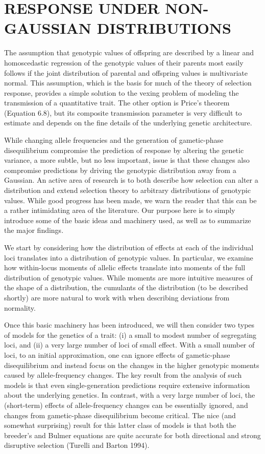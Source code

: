 \documentclass{article}
\begin{document}
\section{RESPONSE UNDER NON-GAUSSIAN DISTRIBUTIONS}
The assumption that genotypic values of offspring are described by a linear and homoscedastic regression of the genotypic values of their parents most easily follows if the joint distribution of parental and offspring values is multivariate normal. This assumption, which is the basis for much of the theory of selection response, provides a simple solution to the vexing problem of modeling the transmission of a quantitative trait. The other option is Price's theorem (Equation 6.8), but its composite transmission parameter is very difficult to estimate and depends on the fine details of the underlying genetic architecture.

While changing allele frequencies and the generation of gametic-phase disequilibrium compromise the prediction of response by altering the genetic variance, a more subtle, but no less important, issue is that these changes also compromise predictions by driving the genotypic distribution away from a Gaussian. An active area of research is to both describe how selection can alter a distribution and extend selection theory to arbitrary distributions of genotypic values. While good progress has been made, we warn the reader that this can be a rather intimidating area of the literature. Our purpose here is to simply introduce some of the basic ideas and machinery used, as well as to summarize the major findings.

We start by considering how the distribution of effects at each of the individual loci translates into a distribution of genotypic values. In particular, we examine how within-locus moments of allelic effects translate into moments of the full distribution of genotypic values. While moments are more intuitive measures of the shape of a distribution, the cumulants of the distribution (to be described shortly) are more natural to work with when describing deviations from normality.

Once this basic machinery has been introduced, we will then consider two types of models for the genetics of a trait: (i) a small to modest number of segregating loci, and (ii) a very large number of loci of small effect. With a small number of loci, to an initial approximation, one can ignore effects of gametic-phase disequilibrium and instead focus on the changes in the higher genotypic moments caused by allele-frequency changes. The key result from the analysis of such models is that even single-generation predictions require extensive information about the underlying genetics. In contrast, with a very large number of loci, the (short-term) effects of allele-frequency changes can be essentially ignored, and changes from gametic-phase disequilibrium become critical. The nice (and somewhat surprising) result for this latter class of models is that both the breeder's and Bulmer equations are quite accurate for both directional and strong disruptive selection (Turelli and Barton 1994).
\end{document}
